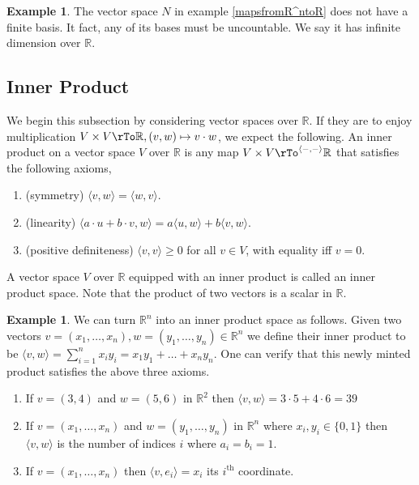 \documentclass[12pt]{amsart}
\theoremstyle{definition}
\newtheorem{example}[theorem]{Example}
\begin{document}
\begin{example} The vector space $N$ in example \ref{mapsfromR^ntoR} does not have a finite basis. It fact, any of its bases must be uncountable. We say it has infinite dimension over $\mathbb{R}$.
\end{example}

\subsection{Inner Product} We begin this subsection by considering vector spaces over $\mathbb{R}$. If they are to enjoy multiplication $V \times V \rTo \mathbb{R}, (v, w) \mapsto v \cdot w$, we expect the following.
\dfn An inner product on a vector space $V$ over $\mathbb{R}$ is any map $V \times V \rTo^{\langle -, - \rangle} \mathbb{R}$ that satisfies the following axioms,
\begin{enumerate}[\indent 1.]
\item (symmetry) $\langle v, w \rangle = \langle w, v \rangle$.
\item (linearity) $\langle a \cdot u + b \cdot v, w \rangle = a \langle u, w \rangle + b \langle v, w \rangle$.
\item (positive definiteness) $\langle v, v \rangle \geq 0$ for all $v \in V$, with equality iff $v = 0$.
\end{enumerate}

A vector space $V$ over $\mathbb{R}$ equipped with an inner product is called an inner product space. Note that the product of two vectors is a scalar in $\mathbb{R}$.

\begin{example}\label{usualinnerproductforR^n} We can turn $\mathbb{R}^n$ into an inner product space as follows. Given two vectors $v = (x_1, \dots, x_n), w = (y_1, \dots, y_n) \in \mathbb{R}^n$ we define their inner product to be $\langle v, w \rangle = \sum\limits_{i = 1}^n x_i y_i = x_1y_1 + \ldots + x_n y_n$. One can verify that this newly minted product satisfies the above three axioms.
\begin{enumerate}[\indent a.]
\item If $v = (3,4)$ and $w = (5,6)$ in $\mathbb{R}^2$ then $\langle v, w \rangle = 3 \cdot 5 + 4 \cdot 6 = 39$
\item  If $v = (x_1, \dots, x_n)$ and $w = (y_1, \dots, y_n)$ in $\mathbb{R}^n$ where $x_i, y_i \in \{0,1\}$ then $\langle v, w \rangle$ is the number of indices $i$ where $a_i = b_i = 1$.
\item If $v = (x_1, \dots, x_n)$ then $\langle v, e_i \rangle = x_i$ its $i^{\text{th}}$ coordinate.
\end{enumerate}
\end{example}
\end{document}
